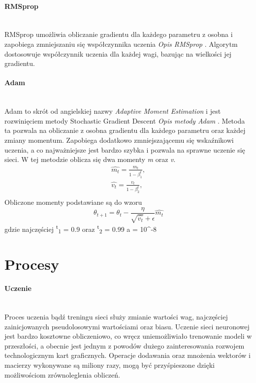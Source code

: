 \paragraph{RMSprop} \mbox{}\\
RMSprop umożliwia obliczanie gradientu dla każdego parametru z osobna i zapobiega
zmniejszaniu się współczynnika uczenia \textit{Opis RMSprop} \cite{RMSpropOptimizer, OptimizersOverview}.
Algorytm dostosowuje współczynnik uczenia dla każdej wagi,
bazując na wielkości jej gradientu.

\paragraph{Adam} \mbox{}\\
Adam to skrót od angielskiej nazwy \textit{Adaptive Moment Estimation} i jest rozwinięciem
metody Stochastic Gradient Descent \textit{Opis metody Adam} \cite{AdamOptimizer, OptimizersOverview}.
Metoda ta pozwala na obliczanie z osobna gradientu dla
każdego parametru oraz każdej zmiany momentum. Zapobiega dodatkowo zmniejszającemu się
wskaźnikowi uczenia, a co najważniejsze jest bardzo szybka i pozwala na sprawne uczenie
się sieci. W tej metodzie oblicza się dwa momenty \textit{m} oraz \textit{v}.
\begin{equation}
\begin{align*}
\hat{m_t} = \frac{m_t} {1 - \beta^t_1}, \\
\hat{v_t} = \frac{v_t} {1 - \beta^t_2}, \\
\end{align*}
\end{equation}
Obliczone momenty podstawiane są do wzoru
\begin{equation}
\theta_{t+1} = \theta_t - \frac {\eta} {\sqrt{\hat{v_t}} + \epsilon} \hat{m_t}
\end{equation}
gdzie najczęściej \textbeta \textsuperscript{t}\textsubscript{1} = 0.9 oraz
\textbeta \textsuperscript{t}\textsubscript{2} = 0.99 a \straightepsilon = 10^{-8}\\

\section{Procesy}

\paragraph{Uczenie} \mbox{}\\
Proces uczenia bądź treningu sieci służy zmianie wartości wag, najczęściej zainicjowanych
pseudolosowymi wartościami oraz biasu. Uczenie sieci neuronowej jest bardzo
kosztowne obliczeniowo, co wręcz uniemożliwiało trenowanie modeli w przeszłości,
a obecnie jest jednym z powodów dużego zainteresowania rozwojem technologicznym kart
graficznych. Operacje dodawania oraz mnożenia wektorów i macierzy wykonywane są miliony razy,
mogą być przyśpieszone dzięki możliwościom zrównoleglenia obliczeń.\\

